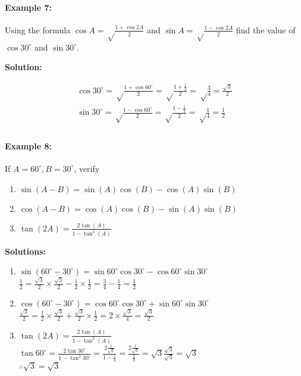 \documentclass{article}
\begin{document}
\paragraph{Example 7:}
Using the formula $\cos A = \sqrt\frac{1+\cos2A}{2}$ and $\sin A = \sqrt\frac{1-\cos2A}{2}$
find the value of $\cos30^{\circ}$ and $\sin30^{\circ}$.

{\scriptsize \textbf{Solution:}}

\[
  \begin{aligned}
    \cos30^{\circ} = \sqrt\frac{1+\cos60^{\circ}}{2} =  \sqrt\frac{1+\frac{1}{2}}{2} = \sqrt\frac{3}{4} = \frac{\sqrt{3}}{2} \\
    \sin30^{\circ} = \sqrt\frac{1-\cos60^{\circ}}{2} =  \sqrt\frac{1-\frac{1}{2}}{2} = \sqrt\frac{1}{4} = \frac{1}{2} \\
  \end{aligned}
\]

\paragraph{Example 8:}
If $A = 60^{\circ}, B = 30^{\circ}$, verify

\begin{enumerate}[label=\alph*)]
  \item $\sin(A-B) = \sin(A) \cos(B) - \cos(A) \sin(B)$
  \item $\cos(A-B) = \cos(A) \cos(B) - \sin(A) \sin(B)$
  \item $\tan(2A) = \frac{2\tan(A)}{1-\tan^{2}(A)}$
\end{enumerate}

{\scriptsize \textbf{Solutions:}}

\begin{enumerate}[label=\alph*)]
  \item $\sin(60^{\circ}-30^{\circ}) = \sin60^{\circ}\cos30^{\circ} - \cos60^{\circ}\sin30^{\circ}$ \\
        $ \frac{1}{2} = \frac{\sqrt{3}}{2} \times \frac{\sqrt{3}}{2} - \frac{1}{2} \times \frac{1}{2} = \frac{3}{4} - \frac{1}{4} = \frac{1}{2} $
  \item $\cos(60^{\circ}-30^{\circ}) = \cos60^{\circ}\cos30^{\circ} + \sin60^{\circ}\sin30^{\circ}$ \\
        $ \frac{\sqrt{3}}{2} = \frac{1}{2} \times \frac{\sqrt{3}}{2} + \frac{\sqrt{3}}{2} \times \frac{1}{2} = 2 \times \frac{\sqrt{3}}{4} = \frac{\sqrt{3}}{2}$
  \item $\tan(2A) = \frac{2\tan(A)}{1-\tan^{2}(A)}$ \\
        $ \tan 60^{\circ} = \frac{2\tan30^{\circ}}{1-\tan^{2}30^{\circ}} = \frac{2\frac{1}{\sqrt{3}}}{1-\frac{1}{3}} = \frac{2\frac{1}{\sqrt{3}}}{\frac{2}{3}} = \sqrt{3} \frac{\sqrt{3}}{\sqrt{3}} = \sqrt{3}$ \\
        $\therefore \sqrt{3} = \sqrt{3}$
\end{enumerate}
\end{document}
